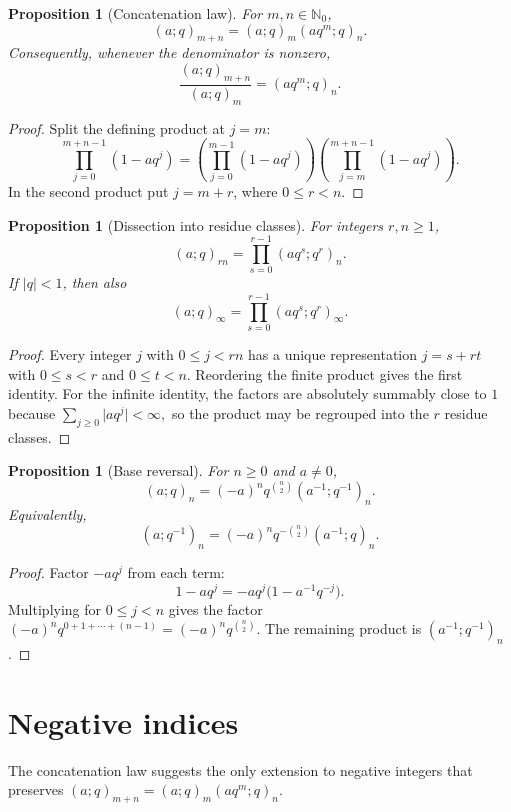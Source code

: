\documentclass[11pt,oneside,openany]{book}
\newtheorem{proposition}[theorem]{Proposition}
\theoremstyle{definition}
\theoremstyle{remark}
\newcommand{\N}{\mathbb N}
\newcommand{\abs}[1]{\lvert #1\rvert}
\begin{document}
\begin{proposition}[Concatenation law]\label{prop:concat}
For $m,n\in\N_0$,
\[
 (a;q)_{m+n}=(a;q)_m(aq^m;q)_n.
\]
Consequently, whenever the denominator is nonzero,
\[
 \frac{(a;q)_{m+n}}{(a;q)_m}=(aq^m;q)_n.
\]
\end{proposition}

\begin{proof}
Split the defining product at $j=m$:
\[
 \prod_{j=0}^{m+n-1}(1-aq^j)
 =\left(\prod_{j=0}^{m-1}(1-aq^j)\right)
  \left(\prod_{j=m}^{m+n-1}(1-aq^j)\right).
\]
In the second product put $j=m+r$, where $0\le r<n$.
\end{proof}

\begin{proposition}[Dissection into residue classes]\label{prop:dissection}
For integers $r,n\ge1$,
\[
 (a;q)_{rn}=\prod_{s=0}^{r-1}(aq^s;q^r)_n.
\]
If $\abs q<1$, then also
\[
 (a;q)_\infty=\prod_{s=0}^{r-1}(aq^s;q^r)_\infty.
\]
\end{proposition}

\begin{proof}
Every integer $j$ with $0\le j<rn$ has a unique representation $j=s+rt$ with $0\le s<r$ and $0\le t<n$.  Reordering the finite product gives the first identity.  For the infinite identity, the factors are absolutely summably close to $1$ because
\(
 \sum_{j\ge0}\abs{a q^j}<\infty,
\)
so the product may be regrouped into the $r$ residue classes.
\end{proof}

\begin{proposition}[Base reversal]\label{prop:base-reversal}
For $n\ge0$ and $a\ne0$,
\[
 (a;q)_n=(-a)^n q^{\binom n2}(a^{-1};q^{-1})_n.
\]
Equivalently,
\[
 (a;q^{-1})_n=(-a)^nq^{-\binom n2}(a^{-1};q)_n.
\]
\end{proposition}

\begin{proof}
Factor $-aq^j$ from each term:
\[
 1-aq^j=-aq^j\bigl(1-a^{-1}q^{-j}\bigr).
\]
Multiplying for $0\le j<n$ gives the factor
\(
 (-a)^nq^{0+1+\cdots+(n-1)}=(-a)^nq^{\binom n2}.
\)
The remaining product is $(a^{-1};q^{-1})_n$.
\end{proof}

\section{Negative indices}

The concatenation law suggests the only extension to negative integers that preserves
\((a;q)_{m+n}=(a;q)_m(aq^m;q)_n\).
\end{document}
